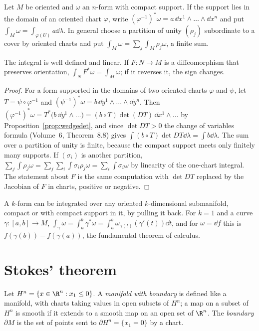 \begin{definition}
Let $M$ be oriented and $\omega$ an $n$-form with compact support. If the support lies in the domain of an oriented chart $\varphi$, write
$(\varphi^{-1})^*\omega=a\,\dd x^1\wedge\dots\wedge\dd x^n$ and put $\int_M\omega=\int_{\varphi(U)}a\dd\lambda$. In general choose a partition of unity $(\rho_j)$ subordinate to a cover by
oriented charts and put $\int_M\omega=\sum_j\int_M\rho_j\omega$, a finite sum.
\end{definition}

\begin{proposition}\label{prop:intwelldef}
The integral is well defined and linear. If $F\colon N\to M$ is a diffeomorphism that preserves orientation, $\int_NF^*\omega=\int_M\omega$; if it reverses it, the sign
changes.
\end{proposition}
\begin{proof}
For a form supported in the domains of two oriented charts $\varphi$ and $\psi$, let $T=\psi\circ\varphi^{-1}$ and $(\psi^{-1})^*\omega=b\,\dd y^1\wedge\dots\wedge\dd y^n$. Then
$(\varphi^{-1})^*\omega=T^*\bigl(b\,\dd y^1\wedge\dots\bigr)=(b\circ T)\det(DT)\,\dd x^1\wedge\dots$ by Proposition~\ref{prop:wedgedet}, and since $\det DT>0$ the change of variables
formula (Volume~6, Theorem~8.8) gives $\int(b\circ T)\det DT\dd\lambda=\int b\dd\lambda$. The sum over a partition of unity is finite, because the compact support
meets only finitely many supports. If $(\sigma_i)$ is another partition,
$\sum_j\int\rho_j\omega=\sum_j\sum_i\int\sigma_i\rho_j\omega=\sum_i\int\sigma_i\omega$ by linearity of the one-chart integral. The statement about $F$ is the same computation
with $\det DT$ replaced by the Jacobian of $F$ in charts, positive or negative.
\end{proof}

A $k$-form can be integrated over any oriented $k$-dimensional submanifold, compact or with compact support in it, by pulling it back. For $k=1$ and a curve
$\gamma\colon[a,b]\to M$, $\int_\gamma\omega=\int_a^b\gamma^*\omega=\int_a^b\omega_{\gamma(t)}(\gamma'(t))\dd t$, and for $\omega=\dd f$ this is $f(\gamma(b))-f(\gamma(a))$, the
fundamental theorem of calculus.

\section{Stokes' theorem}

\begin{definition}
Let $H^n=\{x\in\R^n:x_1\le0\}$. A \emph{manifold with boundary} is defined like a manifold, with charts taking values in open subsets of $H^n$; a map on a
subset of $H^n$ is smooth if it extends to a smooth map on an open set of $\R^n$. The \emph{boundary} $\partial M$ is the set of points sent to
$\partial H^n=\{x_1=0\}$ by a chart.
\end{definition}

